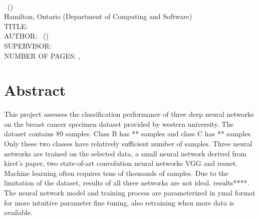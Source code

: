 \documentclass[
12pt, %
oneside, %
english, %
onehalfpacing, %
]{McMasterThesis} %
\begin{document}
\noindent %
\univname \\ 
\degreename\, (\the\year) \\
Hamilton, Ontario (Department of Computing and Software) \\[1.5cm]
TITLE: \ttitle \\
AUTHOR: \authorname\,  %
(\univname)  \\
SUPERVISOR: \supname\, \\ 
NUMBER OF PAGES: \pageref{lastoffront}, \pageref{LastPage}  %

\clearpage


\section*{\Huge Abstract} 
This project assesses the classification performance of three deep neural networks on the breast cancer specimen dataset provided by western university. The dataset contains 89 samples. Class B has ** samples and class C has ** samples. Only these two classes have relatively sufficient number of samples. Three neural networks are trained on the selected data, a small neural network derived from kiret’s paper, two state-of-art convolution neural networks VGG and resnet. Machine learning often requires tens of thousands of samples. Due to the limitation of the dataset, results of all three networks are not ideal. results****. The neural network model and training process are parameterized in ymal format for more intuitive parameter fine tuning, also retraining when more data is available.\clearpage
\end{document}
